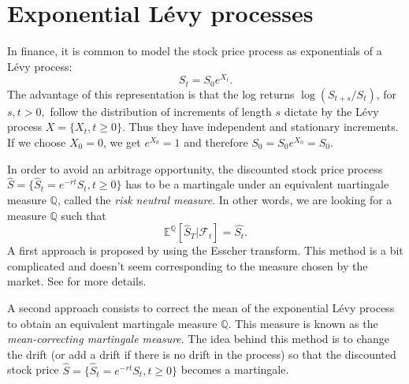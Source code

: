 \section{Exponential L\'evy processes}
\label{sec:Levy:exponential_processes}

In finance, it is common to model the stock price process as exponentials of a L\'evy process:
$$S_t = S_0 e^{X_t}. $$
The advantage of this representation is that the log returns $\log(S_{t+s}/S_t)$, for $s,t>0,$ follow the distribution of increments of length $s$ dictate by the L\'evy process $X=\{X_t,t\geq0\}$. Thus they have independent and stationary increments. If we choose $X_0=0$, we get $e^{X_0}=1$ and therefore $S_0=S_0e^{X_0}=S_0$. 

In order to avoid an arbitrage opportunity, the discounted stock price process $\hat{S}=\{\hat{S}_t = e^{-rt}S_t,t\geq0\}$ has to be a martingale under an equivalent martingale measure $\mathbb{Q}$, called the \textit{risk neutral measure}. In other words, we are looking for a measure $\mathbb{Q}$ such that
$$\mathbb{E}^\mathbb{Q}\left[\hat{S}_T|\mathcal{F}_t\right]=\hat{S_t}.$$
A first approach is proposed by \citeauthor{Ger94} \citeyearpar{Ger94} using the Esscher transform. This method is a bit complicated and doesn't seem corresponding to the measure chosen by the market. See \citeauthor{Sch03} \citeyearpar{Sch03} for more details.

A second approach consists to correct the mean of the exponential L\'evy process to obtain an equivalent martingale measure $\mathbb{Q}$. This measure is known as the \textit{mean-correcting martingale measure}. The idea behind this method is to change the drift (or add a drift if there is no drift in the process) so that the discounted stock price $\hat{S} = \{\hat{S}_t=e^{-rt}S_t, t\geq 0\}$ becomes a martingale.



